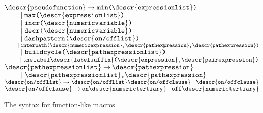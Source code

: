 \begin{figure}[htp]
\begin{ctabbing}
$\tt \descr{pseudo function} \rightarrow min\hbox{\tt (}\descr{expression list}\hbox{\tt )}$\\
$\tt \qquad \;|\; max\hbox{\tt (}\descr{expression list}\hbox{\tt )}$\\
$\tt \qquad \;|\; incr\hbox{\tt (}\descr{numeric variable}\hbox{\tt )}$\\
$\tt \qquad \;|\; decr\hbox{\tt (}\descr{numeric variable}\hbox{\tt )}$\\
$\tt \qquad \;|\; dashpattern\hbox{\tt (}\descr{on\hbox{\tt /}off list}\hbox{\tt )}$\\
$\tt \qquad \;|\; interpath\hbox{\tt (}\descr{numeric expression}\hbox{\tt ,} \descr{path expression}\hbox{\tt ,} \descr{path expression}\hbox{\tt )}$\\
$\tt \qquad \;|\; buildcycle\hbox{\tt (}\descr{path expression list}\hbox{\tt )}$\\
$\tt \qquad \;|\; thelabel\descr{label suffix}\hbox{\tt (}\descr{expression}\hbox{\tt ,} \descr{pair expression}\hbox{\tt )}$\\
$\tt \descr{path expression list} \rightarrow \descr{path expression}$\\
$\tt \qquad \;|\; \descr{path expression list}\hbox{\tt ,} \descr{path expression}$\\
$\tt \descr{on\hbox{\tt /}off list} \rightarrow \descr{on\hbox{\tt /}off list}\descr{on\hbox{\tt /}off clause} \;|\; \descr{on\hbox{\tt /}off clause}$\\
$\tt \descr{on\hbox{\tt /}off clause} \rightarrow on \descr{numeric tertiary} \;|\; off \descr{numeric tertiary}$
\end{ctabbing}
\caption{The syntax for function-like macros}
%
\label{sypseudo}
\end{figure}

